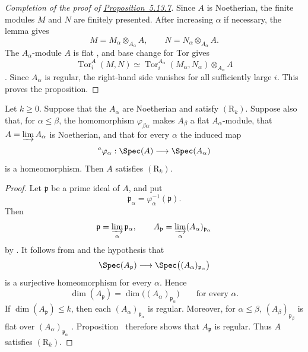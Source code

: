 \begin{proof}[Completion of the proof of {\hyperref[IV.5.13.7]{Proposition~5.13.7}}]
Since $A$ is Noetherian, the finite modules $M$ and $N$ are
finitely presented.  After increasing $\alpha$ if necessary, the
lemma gives
\[
  M=M_\alpha\otimes_{A_\alpha}A,
  \qquad
  N=N_\alpha\otimes_{A_\alpha}A.
\]
The $A_\alpha$-module $A$ is flat , and base
change for Tor gives
\[
  \operatorname{Tor}^{A}_i(M,N)
  \simeq
  \operatorname{Tor}^{A_\alpha}_i(M_\alpha,N_\alpha)
  \otimes_{A_\alpha}A
\]
.  Since $A_\alpha$ is regular, the
right-hand side vanishes for all sufficiently large $i$.  This
proves the proposition.
\end{proof}

\begin{corollary}[5.13.8]
\label{IV.5.13.8}
Let $k\geq0$.  Suppose that the $A_\alpha$ are Noetherian and
satisfy $(\mathrm R_k)$.  Suppose also that, for
$\alpha\leq\beta$, the homomorphism $\varphi_{\beta\alpha}$
makes $A_\beta$ a flat $A_\alpha$-module, that
$A=\varinjlim A_\alpha$ is Noetherian, and that for every
$\alpha$ the induced map
\[
  {}^{a}\varphi_\alpha:
  \Spec(A)\longrightarrow\Spec(A_\alpha)
\]
is a homeomorphism.  Then $A$ satisfies $(\mathrm R_k)$.
\end{corollary}

\begin{proof}
Let $\mathfrak p$ be a prime ideal of $A$, and put
\[
  \mathfrak p_\alpha
  =\varphi_\alpha^{-1}(\mathfrak p).
\]
Then
\[
  \mathfrak p=\varinjlim_\alpha\mathfrak p_\alpha,
  \qquad
  A_{\mathfrak p}
  =\varinjlim_\alpha(A_\alpha)_{\mathfrak p_\alpha}
\]
by .  It follows from
 and the hypothesis that
\[
  \Spec(A_{\mathfrak p})
  \longrightarrow
  \Spec\bigl((A_\alpha)_{\mathfrak p_\alpha}\bigr)
\]
is a surjective homeomorphism for every $\alpha$.  Hence
\[
  \dim(A_{\mathfrak p})
  =
  \dim\bigl((A_\alpha)_{\mathfrak p_\alpha}\bigr)
  \qquad\text{for every }\alpha.
\]
If $\dim(A_{\mathfrak p})\leq k$, then each
$(A_\alpha)_{\mathfrak p_\alpha}$ is regular.  Moreover, for
$\alpha\leq\beta$,
$(A_\beta)_{\mathfrak p_\beta}$ is flat over
$(A_\alpha)_{\mathfrak p_\alpha}$ .
Proposition~ therefore shows that
$A_{\mathfrak p}$ is regular.  Thus $A$ satisfies
$(\mathrm R_k)$.
\end{proof}
